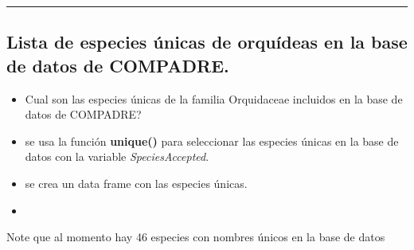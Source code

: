 \documentclass[
]{book}
\newenvironment{Shaded}{\begin{snugshade}}{\end{snugshade}}
\newcommand{\FunctionTok}[1]{\textcolor[rgb]{0.13,0.29,0.53}{\textbf{#1}}}
\newcommand{\NormalTok}[1]{#1}
\newcommand{\SpecialCharTok}[1]{\textcolor[rgb]{0.81,0.36,0.00}{\textbf{#1}}}
\providecommand{\tightlist}{%
  \setlength{\itemsep}{0pt}\setlength{\parskip}{0pt}}
\theoremstyle{definition}
\theoremstyle{definition}
\theoremstyle{definition}
\theoremstyle{definition}
\theoremstyle{remark}
\begin{document}
\begin{center}\rule{0.5\linewidth}{0.5pt}\end{center}

\subsection{Lista de especies únicas de orquídeas en la base de datos de COMPADRE.}\label{lista-de-especies-uxfanicas-de-orquuxeddeas-en-la-base-de-datos-de-compadre.}

\begin{itemize}
\tightlist
\item
  Cual son las especies únicas de la familia Orquidaceae incluidos en la base de datos de COMPADRE?
\item
  se usa la función \textbf{unique()} para seleccionar las especies únicas en la base de datos con la variable \emph{SpeciesAccepted}.
\item
  se crea un data frame con las especies únicas.
\item
\end{itemize}

Note que al momento hay 46 especies con nombres únicos en la base de datos

\begin{Shaded}
\end{Shaded}
\end{document}
